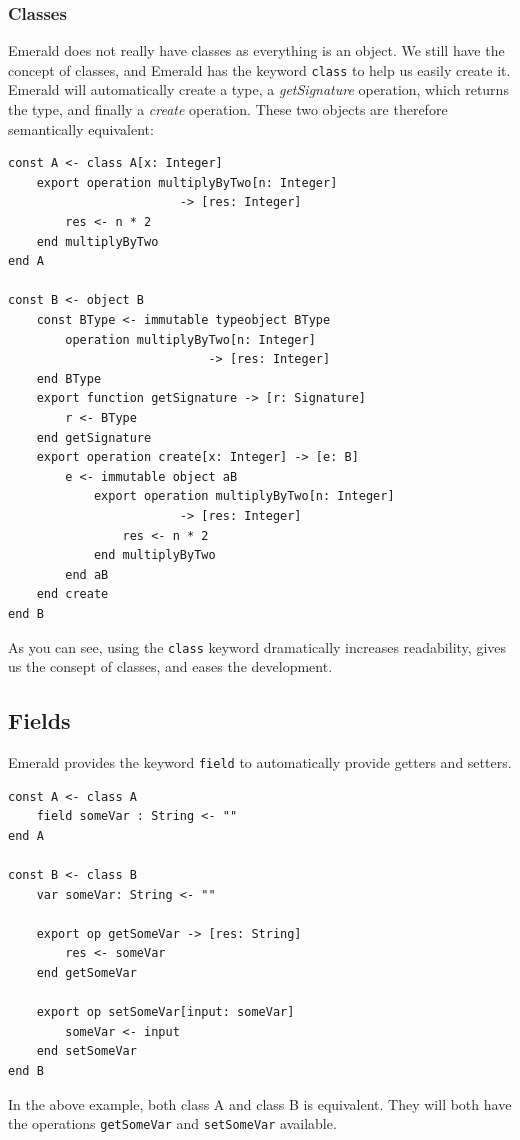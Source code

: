 \subsubsection{Classes}
Emerald does not really have classes as everything is an object. We still have the concept of classes, and Emerald has the keyword \verb|class| to help us easily create it. Emerald will automatically create a type, a \textit{getSignature} operation, which returns the type, and finally a \textit{create} operation. These two objects are therefore semantically equivalent:
\begin{lstlisting}[language=emerald]
const A <- class A[x: Integer]
    export operation multiplyByTwo[n: Integer]
                        -> [res: Integer]
        res <- n * 2
    end multiplyByTwo
end A

const B <- object B
    const BType <- immutable typeobject BType
        operation multiplyByTwo[n: Integer]
                            -> [res: Integer]
    end BType
    export function getSignature -> [r: Signature]
        r <- BType
    end getSignature
    export operation create[x: Integer] -> [e: B]
        e <- immutable object aB
            export operation multiplyByTwo[n: Integer]
                        -> [res: Integer]
                res <- n * 2
            end multiplyByTwo
        end aB
    end create
end B
\end{lstlisting}
As you can see, using the \verb|class| keyword dramatically increases readability, gives us the consept of classes, and eases the development.

\subsection{Fields}\label{emerald:fields}
Emerald provides the keyword \verb|field| to automatically provide getters and setters.
\begin{lstlisting}[language=emerald]
const A <- class A
    field someVar : String <- ""
end A

const B <- class B
    var someVar: String <- ""
    
    export op getSomeVar -> [res: String]
        res <- someVar
    end getSomeVar
    
    export op setSomeVar[input: someVar]
        someVar <- input
    end setSomeVar
end B
\end{lstlisting}
In the above example, both class A and class B is equivalent. They will both have the operations \verb|getSomeVar| and \verb|setSomeVar| available.


